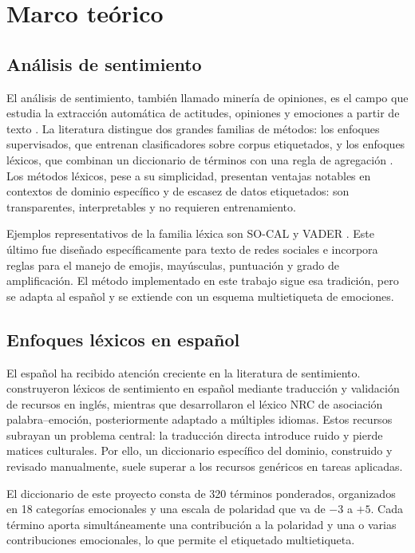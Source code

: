 \section{Marco teórico}
\label{sec:marco}

\subsection{Análisis de sentimiento}

El análisis de sentimiento, también llamado minería de opiniones, es el campo que estudia
la extracción automática de actitudes, opiniones y emociones a partir de texto
\citep{liu2012sentiment}. La literatura distingue dos grandes familias de métodos: los
enfoques supervisados, que entrenan clasificadores sobre corpus etiquetados, y los
enfoques léxicos, que combinan un diccionario de términos con una regla de agregación
\citep{taboada2011socal}. Los métodos léxicos, pese a su simplicidad, presentan ventajas
notables en contextos de dominio específico y de escasez de datos etiquetados: son
transparentes, interpretables y no requieren entrenamiento.

Ejemplos representativos de la familia léxica son SO-CAL \citep{taboada2011socal} y
VADER \citep{hutto2014vader}. Este último fue dise\~nado específicamente para texto de
redes sociales e incorpora reglas para el manejo de emojis, mayúsculas, puntuación y
grado de amplificación. El método implementado en este trabajo sigue esa tradición, pero
se adapta al espa\~nol y se extiende con un esquema multietiqueta de emociones.

\subsection{Enfoques léxicos en espa\~nol}

El espa\~nol ha recibido atención creciente en la literatura de sentimiento.
\citet{perez2012spanish} construyeron léxicos de sentimiento en espa\~nol mediante
traducción y validación de recursos en inglés, mientras que \citet{mohammad2013emolex}
desarrollaron el léxico NRC de asociación palabra--emoción, posteriormente adaptado a
múltiples idiomas. Estos recursos subrayan un problema central: la traducción directa
introduce ruido y pierde matices culturales. Por ello, un diccionario específico del
dominio, construido y revisado manualmente, suele superar a los recursos genéricos en
tareas aplicadas.

El diccionario de este proyecto consta de 320 términos ponderados, organizados en 18
categorías emocionales y una escala de polaridad que va de $-3$ a $+5$. Cada término
aporta simultáneamente una contribución a la polaridad y una o varias contribuciones
emocionales, lo que permite el etiquetado multietiqueta.

